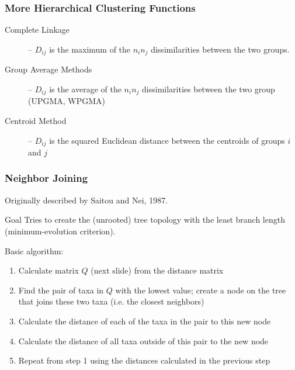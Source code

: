 \documentclass{beamer}
\begin{document}
{ 

}


\begin{frame}
  \frametitle{More Hierarchical Clustering Functions}


\begin{description}

\item[Complete Linkage] -- $D_{ij}$ is the maximum of the $n_i n_j$ dissimilarities between the two groups.

\item[Group Average Methods] -- $D_{ij}$ is the average of the $n_i n_j$  dissimilarities between the two group (UPGMA, WPGMA)

\item[Centroid Method] -- $D_{ij}$ is the squared Euclidean distance between the centroids of groups $i$ and $j$

\end{description}

\end{frame}

\begin{frame}[shrink=5]
\frametitle{Neighbor Joining}

Originally described by Saitou and Nei, 1987.

\begin{block}{Goal}
Tries to create the (unrooted) tree topology with the least branch length
(minimum-evolution criterion).
\end{block}

Basic algorithm:
\begin{enumerate}
\item Calculate matrix $Q$ (next slide) from the distance matrix
\item Find the pair of taxa in $Q$ with the lowest value; create a node on the tree that joins these two taxa (i.e. the closest neighbors)
\item Calculate the distance of each of the taxa in the pair to this new node
\item Calculate the distance of all taxa outside of this pair to the new node
\item Repeat from step 1 using the distances calculated in the previous step
\end{enumerate}

\end{frame}
\end{document}
